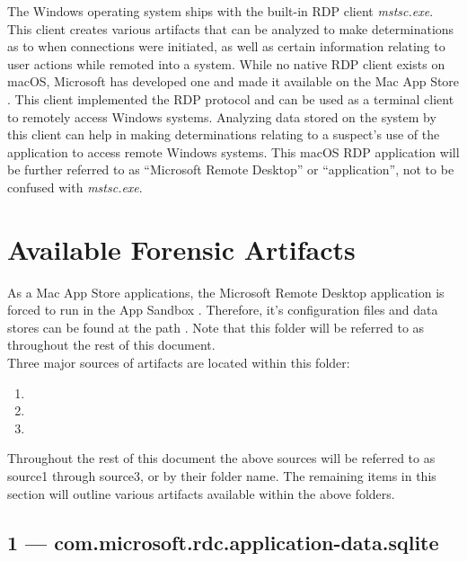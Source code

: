 \documentclass[journal]{IEEEtran}
\begin{document}
The Windows operating system ships with the built-in RDP client \textit{mstsc.exe}. This client creates various artifacts that can be analyzed to make determinations as to when connections were initiated, as well as certain information relating to user actions while remoted into a system. While no native RDP client exists on macOS, Microsoft has developed one and made it available on the Mac App Store \cite{noauthor_microsoft_nodate}. This client implemented the RDP protocol and can be used as a terminal client to remotely access Windows systems. Analyzing data stored on the system by this client can help in making determinations relating to a suspect’s use of the application to access remote Windows systems. This macOS RDP application will be further referred to as “Microsoft Remote Desktop” or “application”, not to be confused with \textit{mstsc.exe}.

\section{Available Forensic Artifacts}

As a Mac App Store applications, the Microsoft Remote Desktop application is forced to run in the App Sandbox \cite{noauthor_about_nodate}. Therefore, it’s configuration files and data stores can be found at the path . Note that this folder will be referred to as  throughout the rest of this document.\\

\noindent Three major sources of artifacts are located within this folder:
\begin{enumerate}
	\item {}
	\item {}
	\item {}
\end{enumerate}

Throughout the rest of this document the above sources will be referred to as {source1} through {source3}, or by their folder name. The remaining items in this section will outline various artifacts available within the above folders.

\subsection{1 — com.microsoft.rdc.application-data.sqlite}
\end{document}
